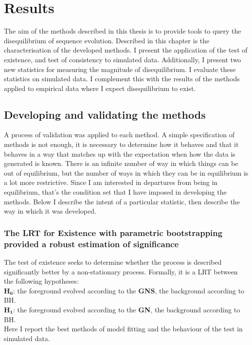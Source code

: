 \chapter{Results}

The aim of the methods described in this thesis is to provide tools to query the disequilibrium of sequence evolution. Described in this chapter is the characterisation of the developed methods. I present the application of the test of existence, and test of consistency to simulated data. Additionally, I present two new statistics for measuring the magnitude of disequilibrium. I evaluate these statistics on simulated data. I complement this with the results of the methods applied to empirical data where I expect disequilibrium to exist.

\section*{Developing and validating the methods}

A process of validation was applied to each method. A simple specification of methods is not enough, it is necessary to determine how it behaves and that it behaves in a way that matches up with the expectation when how the data is generated is known. There is an infinite number of way in which things can be out of equilibrium, but the number of ways in which they can be in equilibrium is a lot more restrictive. Since I am interested in departures from being in equilibrium, that’s the condition set that I have imposed in developing the methods. Below I describe the intent of a particular statistic, then describe the way in which it was developed.

\subsection*{The LRT for Existence with parametric bootstrapping provided a robust estimation of significance}

The test of existence seeks to determine whether the process is described significantly better by a non-stationary process. Formally, it is a LRT between the following hypotheses:\\ $\mathbf{H_0}$: the foreground evolved according to the \textbf{GNS}, the background according to BH. \\ $\mathbf{H_1}$: the foreground evolved according to the \textbf{GN}, the background according to BH.\\
Here I report the best methods of model fitting and the behaviour of the test in simulated data. 

